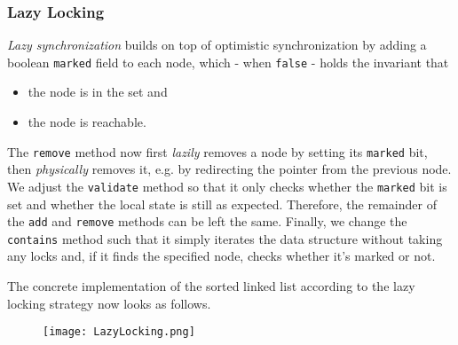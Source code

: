\documentclass[main]{subfiles}
\begin{document}

\subsubsection{Lazy Locking}
\textit{Lazy synchronization} builds on top of optimistic synchronization by adding a boolean \texttt{marked} field to each node, which - when \texttt{false} - holds the invariant that
\begin{itemize}
    \item the node is in the set and
    \item the node is reachable.
\end{itemize}
The \texttt{remove} method now first \textit{lazily} removes a node by setting its \texttt{marked} bit, then \textit{physically} removes it, e.g. by redirecting the pointer from the previous node. We adjust the \texttt{validate} method so that it only checks whether the \texttt{marked} bit is set and whether the local state is still as expected. Therefore, the remainder of the \texttt{add} and \texttt{remove} methods can be left the same. Finally, we change the \texttt{contains} method such that it simply iterates the data structure without taking any locks and, if it finds the specified node, checks whether it's marked or not.
\begin{example}
    The concrete implementation of the sorted linked list according to the lazy locking strategy now looks as follows.
    \begin{figure}[H]
        \centering
        \texttt{[image: LazyLocking.png]}
    \end{figure}
\end{example}

\newpage

\end{document}
